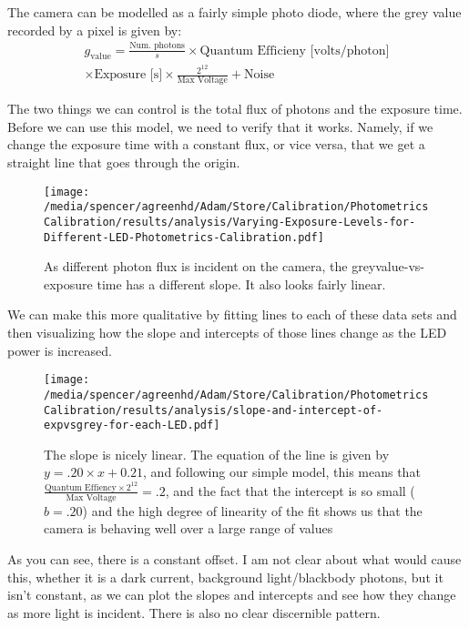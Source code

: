 \documentclass[reprint]{revtex4-1}
\begin{document}
The camera can be modelled as a fairly simple photo diode, where the grey value
recorded by a pixel is given by:
\begin{multline*}
    \label{eq:model}
    g_\textrm{value} = \frac{\textrm{Num. photons}}{s} \times \textrm{Quantum
    Efficieny [volts/photon]} \\
    \times \textrm{Exposure [s]} \times \frac{2^{12}}{\textrm{Max
    Voltage}}+\textrm{Noise} 
\end{multline*}

The two things we can control is the total flux of photons and the exposure
time. Before we can use this model, we need to verify that it works. Namely, if
we change the exposure time with a constant flux, or vice versa, that we get a
straight line that goes through the origin. 
\begin{figure}[H]
    \texttt{[image: /media/spencer/agreenhd/Adam/Store/Calibration/PhotometricsCalibration/results/analysis/Varying-Exposure-Levels-for-Different-LED-Photometrics-Calibration.pdf]}
    \caption{As different photon flux is incident on the camera, the
        greyvalue-vs-exposure time has a different slope. It also looks fairly
    linear.}
\end{figure}

We can make this more qualitative by fitting lines to each of these data sets
and then visualizing how the slope and intercepts of those lines change as the
LED power is increased.
\begin{figure}[H]
    \texttt{[image: /media/spencer/agreenhd/Adam/Store/Calibration/PhotometricsCalibration/results/analysis/slope-and-intercept-of-expvsgrey-for-each-LED.pdf]}
    \caption{The slope is nicely linear. The equation of the line is given by
    $y=.20 \times x + 0.21$, and following our simple model, this means that
    $\frac{\textrm{Quantum Effiency}\times 2^{12}}{\textrm{Max Voltage}} = .2$,
    and the fact that the intercept is so small ($b=.20$) and the high degree of
    linearity of the fit shows us that the camera is behaving well over a large
range of values}
\end{figure}

As you can see, there is a constant offset. I am not clear about what would
cause this, whether it is a dark current, background light/blackbody photons,
but it isn't constant, as we can plot the slopes and intercepts and see how they
change as more light is incident. There is also no clear discernible pattern.
\end{document}
